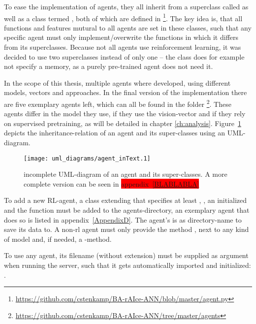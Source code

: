 To ease the implementation of agents, they all inherit from a superclass called  as well as a class termed , both of which are defined in \footnote{\url{https://github.com/cstenkamp/BA-rAIce-ANN/blob/master/agent.py}}. The key idea is, that all functions and features mutural to all agents are set in these classes, such that any specific agent must only implement/overwrite the functions in which it differs from its superclasses. Because not all agents use reinforcement learning, it was decided to use two superclasses instead of only one -- the class  does for example not specify a memory, as a purely pre-trained agent does not need it.

In the scope of this thesis, multiple agents where developed, using different models, vectors and approaches. In the final version of the implementation there are five exemplary agents left, which can all be found in the folder \footnote{\url{https://github.com/cstenkamp/BA-rAIce-ANN/tree/master/agents}}. These agents differ in the model they use, if they use the vision-vector and if they rely on supervised pretraining, as will be detailed in chapter \ref{ch:analysis}. %
Figure~\ref{fig:agentMINI} depicts the inheritance-relation of an agent and its super-classes using an UML-diagram.
\begin{figure}[h]
	\centering 
	\texttt{[image: uml\_diagrams/agent\_inText.1]}  
	\caption[UML-diagram of an agent and its super-classes]{incomplete UML-diagram of an agent and its super-classes. A more complete version can be seen in \colorbox{red}{appendix~\ref{BLABLABLA}}}
	\label{fig:agentMINI}
\end{figure}

To add a new RL-agent, a class extending  that specifies at least , , an initialized  and the function  must be added to the agents-directory, an exemplary agent that does so is listed in appendix~\ref{AppendixD}. The agent's  is as directory-name to save its data to. A non-rl agent must only provide the method , next to any kind of model and, if needed, a -method.

To use any agent, its filename (without extension) must be supplied as argument when running the server, such that it gets automatically imported and initialized: .

